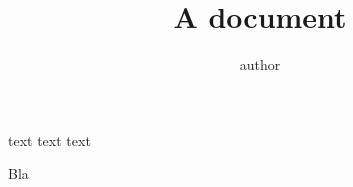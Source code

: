 \documentclass{article}
\title{A document}
\author{author}
\begin{document}
text text text \cite{ref1}
\begin{thebibliography}{9}

  Bla


\end{thebibliography}
\end{document}
